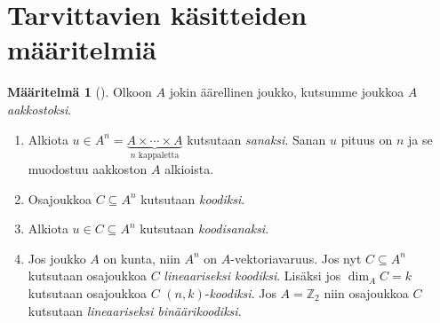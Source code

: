 \documentclass[a4paper,12pt,leqno,oneside]{report} %
\theoremstyle{plain}
\newtheorem{lause}{Lause}[chapter]
\theoremstyle{definition}
\newtheorem{maaritelma}{Määritelmä}[chapter]
\theoremstyle{remark}
\numberwithin{equation}{chapter}
\newcommand*{\Zset}{\mathbb{Z}}  %
\begin{document}
    \section{Tarvittavien käsitteiden määritelmiä}
    \begin{maaritelma}[{\cite[s.~491]{PA}}]
        Olkoon $A$ jokin äärellinen joukko, kutsumme joukkoa $A$ \emph{aakkostoksi}.

        \begin{enumerate}
            \item Alkiota $u \in  A^n = \underbrace{A \times \cdots \times A}_{
                \text{$n$ kappaletta}}$ kutsutaan \emph{sanaksi}. Sanan $u$ pituus on $n$ ja se muodostuu aakkoston $A$ alkioista.
            \item Osajoukkoa $C \subseteq A^n$ kutsutaan \emph{koodiksi}.
            \item Alkiota $u \in C \subseteq A^n$ kutsutaan \emph{koodisanaksi}.
            \item Jos joukko $A$ on kunta, niin $A^n$ on $A$-vektoriavaruus. Jos nyt $C \subseteq A^n$ kutsutaan osajoukkoa $C$ \emph{lineaariseksi koodiksi}. Lisäksi jos $\dim_A C = k$ kutsutaan osajoukkoa $C$ $(n, k)$-\emph{koodiksi}. Jos $A = \Zset_2$ niin osajoukkoa $C$ kutsutaan \emph{lineaariseksi binäärikoodiksi}.
        \end{enumerate}
    \end{maaritelma}



\end{document}
